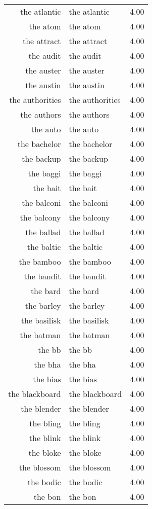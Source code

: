 \begin{table}[ht]
\begin{tabular}{rlr}
  the atlantic & the atlantic & 4.00 \\ 
  the atom & the atom & 4.00 \\ 
  the attract & the attract & 4.00 \\ 
  the audit & the audit & 4.00 \\ 
  the auster & the auster & 4.00 \\ 
  the austin & the austin & 4.00 \\ 
  the authorities & the authorities & 4.00 \\ 
  the authors & the authors & 4.00 \\ 
  the auto & the auto & 4.00 \\ 
  the bachelor & the bachelor & 4.00 \\ 
  the backup & the backup & 4.00 \\ 
  the baggi & the baggi & 4.00 \\ 
  the bait & the bait & 4.00 \\ 
  the balconi & the balconi & 4.00 \\ 
  the balcony & the balcony & 4.00 \\ 
  the ballad & the ballad & 4.00 \\ 
  the baltic & the baltic & 4.00 \\ 
  the bamboo & the bamboo & 4.00 \\ 
  the bandit & the bandit & 4.00 \\ 
  the bard & the bard & 4.00 \\ 
  the barley & the barley & 4.00 \\ 
  the basilisk & the basilisk & 4.00 \\ 
  the batman & the batman & 4.00 \\ 
  the bb & the bb & 4.00 \\ 
  the bha & the bha & 4.00 \\ 
  the bias & the bias & 4.00 \\ 
  the blackboard & the blackboard & 4.00 \\ 
  the blender & the blender & 4.00 \\ 
  the bling & the bling & 4.00 \\ 
  the blink & the blink & 4.00 \\ 
  the bloke & the bloke & 4.00 \\ 
  the blossom & the blossom & 4.00 \\ 
  the bodic & the bodic & 4.00 \\ 
  the bon & the bon & 4.00 \\ 

\end{tabular}
\end{table}
